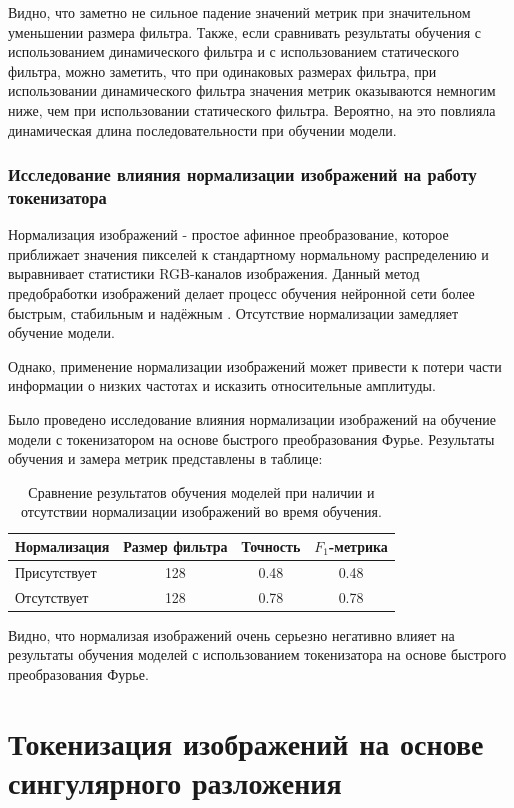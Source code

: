 \documentclass[times,specification,annotation]{itmo-student-thesis}
\begin{document}
Видно, что заметно не сильное падение значений метрик при значительном уменьшении размера фильтра. Также, если сравнивать результаты обучения с использованием динамического фильтра и с использованием статического фильтра, можно заметить, что при одинаковых размерах фильтра, при использовании динамического фильтра значения метрик оказываются немногим ниже, чем при использовании статического фильтра. Вероятно, на это повлияла динамическая длина последовательности при обучении модели.

\subsubsection{Исследование влияния нормализации изображений на работу токенизатора}

Нормализация изображений - простое афинное преобразование, которое приближает значения пикселей к стандартному нормальному распределению и выравнивает статистики RGB-каналов изображения. Данный метод предобработки изображений делает процесс обучения нейронной сети более быстрым, стабильным и надёжным \cite{goodfellow_dl}. Отсутствие нормализации замедляет обучение модели.

Однако, применение нормализации изображений может привести к потери части информации о низких частотах и исказить относительные амплитуды.

Было проведено исследование влияния нормализации изображений на обучение модели с токенизатором на основе быстрого преобразования Фурье. Результаты обучения и замера метрик представлены в таблице:

\begin{table}[H]
  \centering
  \caption{Сравнение результатов обучения моделей при наличии и отсутствии нормализации изображений во время обучения.}
  \label{tab:fft-tokenization-dynamic}
  \begin{tabular}{|l|c|c|c|}
    \hline
    Нормализация & Размер фильтра & Точность & $F_1$-метрика \\ \hline
    Присутствует & 128 & 0.48 & 0.48 \\
    Отсутствует & 128 & 0.78 & 0.78 \\
    \hline
  \end{tabular}
\end{table}

Видно, что нормализая изображений очень серьезно негативно влияет на результаты обучения моделей с использованием токенизатора на основе быстрого преобразования Фурье.

\section{Токенизация изображений на основе сингулярного разложения}
\end{document}
